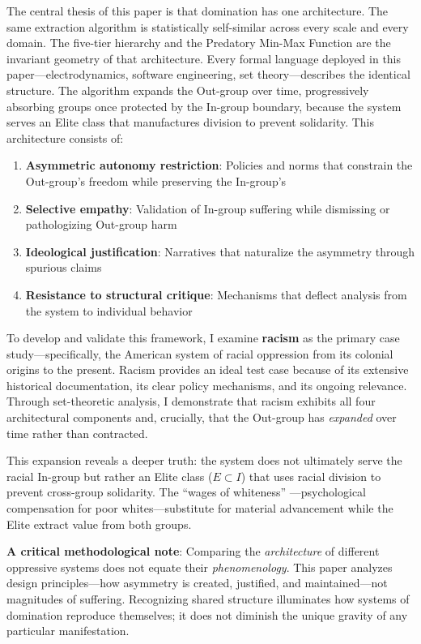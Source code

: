 \documentclass[12pt]{article}
\begin{document}
The central thesis of this paper is that domination has one architecture. The same extraction algorithm is statistically self-similar across every scale and every domain. The five-tier hierarchy and the Predatory Min-Max Function are the invariant geometry of that architecture. Every formal language deployed in this paper---electrodynamics, software engineering, set theory---describes the identical structure. The algorithm expands the Out-group over time, progressively absorbing groups once protected by the In-group boundary, because the system serves an Elite class that manufactures division to prevent solidarity. This architecture consists of:
\begin{enumerate}
    \item \textbf{Asymmetric autonomy restriction}: Policies and norms that constrain the Out-group's freedom while preserving the In-group's
    \item \textbf{Selective empathy}: Validation of In-group suffering while dismissing or pathologizing Out-group harm
    \item \textbf{Ideological justification}: Narratives that naturalize the asymmetry through spurious claims
    \item \textbf{Resistance to structural critique}: Mechanisms that deflect analysis from the system to individual behavior
\end{enumerate}

To develop and validate this framework, I examine \textbf{racism} as the primary case study---specifically, the American system of racial oppression from its colonial origins to the present. Racism provides an ideal test case because of its extensive historical documentation, its clear policy mechanisms, and its ongoing relevance. Through set-theoretic analysis, I demonstrate that racism exhibits all four architectural components and, crucially, that the Out-group has \textit{expanded} over time rather than contracted.

This expansion reveals a deeper truth: the system does not ultimately serve the racial In-group but rather an Elite class ($E \subset I$) that uses racial division to prevent cross-group solidarity. The ``wages of whiteness'' \cite{roediger, dubois}---psychological compensation for poor whites---substitute for material advancement while the Elite extract value from both groups.


\textbf{A critical methodological note}: Comparing the \textit{architecture} of different oppressive systems does not equate their \textit{phenomenology}. This paper analyzes design principles---how asymmetry is created, justified, and maintained---not magnitudes of suffering. Recognizing shared structure illuminates how systems of domination reproduce themselves; it does not diminish the unique gravity of any particular manifestation.
\end{document}

